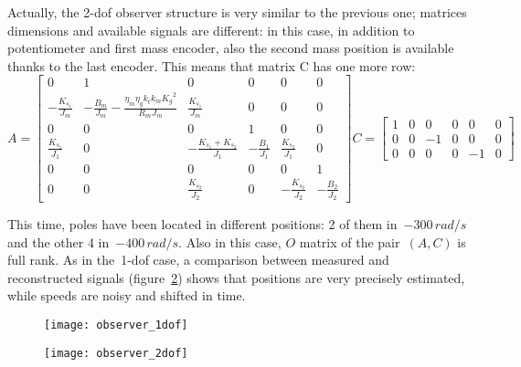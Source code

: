 Actually, the \acrshort{2-dof} observer structure is very similar to the previous one; matrices dimensions and available signals are different: in this case, in addition to potentiometer and first mass encoder, also the second mass position is available thanks to the last encoder. This means that matrix C has one more row:
\begin{equation}
	A = 
	\begin{bmatrix}
		0 &1 & 0 & 0 & 0 & 0 \\
		-\frac{K_{s_1}}{J_m} & -\frac{B_m}{J_m}-\frac{\eta_m \eta_g k_t k_m {K_g}^2}{R_m J_m}  & \frac{K_{s_1}}{J_m} & 0 & 0 & 0 \\
		0 & 0 & 0 & 1 & 0 & 0 \\
		\frac{K_{s_1}}{J_1} & 0 & -\frac{K_{s_1}+K_{s_2}}{J_1} & -\frac{B_1}{J_1} & \frac{K_{s_2}}{J_1} & 0 \\
		0 & 0 & 0 & 0 & 0 & 1 \\
		0 & 0 & \frac{K_{s_2}}{J_2} & 0 & -\frac{K_{s_2}}{J_2} & -\frac{B_2}{J_2}
	\end{bmatrix}
	C =
	\begin{bmatrix}
		1 & 0 & 0 & 0 & 0 & 0 \\
		0 & 0 & -1 & 0 & 0 & 0  \\
		0 & 0 & 0 & 0 & -1 & 0
	\end{bmatrix}
\label{eqn:2dof_mat_obs}
\end{equation}

This time, poles have been located in different positions: 2 of them in~$-300 \, rad/s$ and the other 4 in~$-400 \, rad/s$. Also in this case, $\mathit{O}$ matrix of the pair~$(A,C)$ is full rank. As in the~\acrshort{1-dof} case, a comparison between measured and reconstructed signals (figure~\ref{fig:observer_2dof}) shows that positions are very precisely estimated, while speeds are noisy and shifted in time.

\begin{figure*}
	\centering
	\begin{subfigure}{0.45\columnwidth}
		\texttt{[image: observer\_1dof]}
		\label{fig:observer_1dof}
	\end{subfigure}
	\begin{subfigure}{0.45\columnwidth}
		\texttt{[image: observer\_2dof]}
		\label{fig:observer_2dof}
	\end{subfigure}
	\caption{Observer reconstruction compared to available measurements}
\end{figure*}

